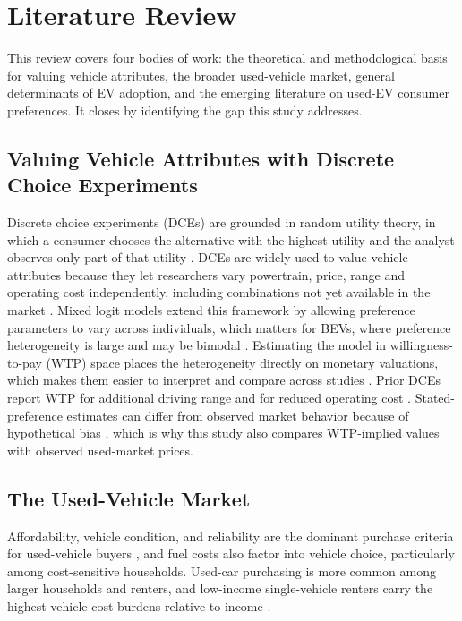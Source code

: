 \documentclass[a4paper,fleqn]{cas-sc}   %
\begin{document}
\section{Literature Review}
\label{section:lit_review}

This review covers four bodies of work: the theoretical and methodological basis for valuing vehicle attributes, the broader used-vehicle market, general determinants of EV adoption, and the emerging literature on used-EV consumer preferences. It closes by identifying the gap this study addresses.

\subsection{Valuing Vehicle Attributes with Discrete Choice Experiments}

Discrete choice experiments (DCEs) are grounded in random utility theory, in which a consumer chooses the alternative with the highest utility and the analyst observes only part of that utility \parencite{trainDiscreteChoiceMethods2009, li2020BEVchoice}. DCEs are widely used to value vehicle attributes because they let researchers vary powertrain, price, range and operating cost independently, including combinations not yet available in the market \parencite{helveston2016EVpreferences, sagepub2020EVattributes}. Mixed logit models extend this framework by allowing preference parameters to vary across individuals, which matters for BEVs, where preference heterogeneity is large and may be bimodal \parencite{helveston2015subsidies}. Estimating the model in willingness-to-pay (WTP) space places the heterogeneity directly on monetary valuations, which makes them easier to interpret and compare across studies \parencite{robersonNotAllSubsidies2022, helveston2015subsidies, trainWeeks2005}. Prior DCEs report WTP for additional driving range and for reduced operating cost \parencite{helveston2015subsidies, forsythe2023technology}. Stated-preference estimates can differ from observed market behavior because of hypothetical bias \parencite{helveston2016EVpreferences, tandf2025usedEV, fifer2014hypothetical}, which is why this study also compares WTP-implied values with observed used-market prices.

\subsection{The Used-Vehicle Market}

Affordability, vehicle condition, and reliability are the dominant purchase criteria for used-vehicle buyers \parencite{consumerreports_usedcar, epa_usedvehicle}, and fuel costs also factor into vehicle choice, particularly among cost-sensitive households. Used-car purchasing is more common among larger households and renters, and low-income single-vehicle renters carry the highest vehicle-cost burdens relative to income \parencite{konstantinou2024usedEV_price}.
\end{document}
